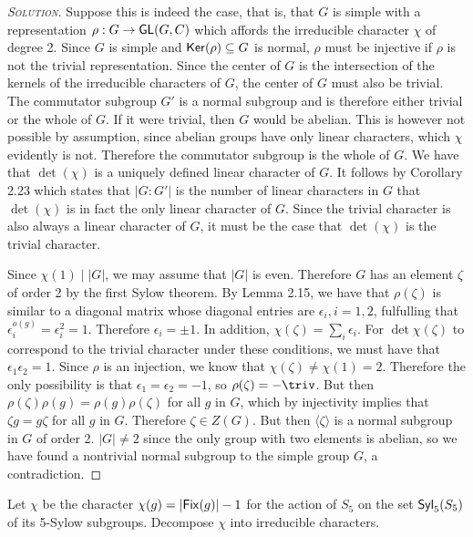 \begin{proof}[{\scshape Solution}]
Suppose this is indeed the case, that is, that $G$ is simple with a representation $\rho: G \to \mathsf{GL}(G, C)$ which affords the irreducible character $\chi$ of degree 2. Since $G$ is simple and $\mathsf{Ker}(\rho) \subseteq G$ is normal, $\rho$ must be injective if $\rho$ is not the trivial representation. Since the center of $G$ is the intersection of the kernels of the irreducible characters of $G$, the center of $G$ must also be trivial. The commutator subgroup $G'$ is a normal subgroup and is therefore either trivial or the whole of $G$. If it were trivial, then $G$ would be abelian. This is however not possible by assumption, since abelian groups have only linear characters, which $\chi$ evidently is not. Therefore the commutator subgroup is the whole of $G$. We have that $\det(\chi)$ is a uniquely defined linear character of $G$. It follows by Corollary 2.23 which states that $\lvert G : G'\rvert$ is the number of linear characters in $G$ that $\det(\chi)$ is in fact the only linear character of $G$. Since the trivial character is also always a linear character of $G$, it must be the case that $\det(\chi)$ is the trivial character.

Since $\chi(1) \mid \lvert G \rvert$, we may assume that $\lvert G\rvert$ is even. Therefore $G$ has an element $\zeta$ of order 2 by the first Sylow theorem. By Lemma 2.15, we have that $\rho(\zeta)$ is similar to a diagonal matrix whose diagonal entries are $\epsilon_i, i = 1, 2$, fulfulling that $\epsilon_i^{o(g)} = \epsilon_i^{2} = 1$. Therefore $\epsilon_i = \pm 1$. In addition, $\chi(\zeta) = \sum_i \epsilon_i$. For $\det{\chi}(\zeta)$ to correspond to the trivial character under these conditions, we must have that $\epsilon_1\epsilon_2 = 1$. Since $\rho$ is an injection, we know that $\chi(\zeta) \neq \chi(1) = 2$. Therefore the only possibility is that $\epsilon_1 = \epsilon_2 = -1$, so $\rho(\zeta) = -\triv$. But then $\rho(\zeta)\rho(g) = \rho(g)\rho(\zeta)$ for all $g$ in $G$, which by injectivity implies that $\zeta g = g\zeta$ for all $g$ in $G$. Therefore $\zeta \in Z(G)$. But then $\langle \zeta \rangle$ is a normal subgroup in $G$ of order 2. $\lvert G \rvert \neq 2$ since the only group with two elements is abelian, so we have found a nontrivial normal subgroup to the simple group $G$, a contradiction.


\end{proof}

\newpage

\begin{problem}
Let $\chi$ be the character $\chi(g) = \lvert \mathsf{Fix}(g) \rvert -1$ for the action of $S_5$ on the set $\mathsf{Syl}_5(S_5)$ of its 5-Sylow subgroups. Decompose $\chi$ into irreducible characters.


\end{problem}

